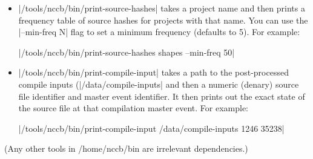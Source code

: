 \documentclass{report}
\begin{document}
\begin{itemize}
\item |/tools/nccb/bin/print-source-hashes| takes a project name and then prints
a frequency table of source hashes for projects with that name.  You can use the
|--min-freq N| flag to set a minimum frequency (defaults to 5).
For example:

|/tools/nccb/bin/print-source-hashes shapes --min-freq 50|

\item |/tools/nccb/bin/print-compile-input| takes a path to the post-processed compile inputs
(|/data/compile-inputs| and then a numeric (denary) source file identifier and master event
identifier.  It then prints out the exact state of the source file at that compilation master
event.  For example:

|/tools/nccb/bin/print-compile-input /data/compile-inputs 1246 35238|
\end{itemize}
(Any other tools in /home/nccb/bin are irrelevant dependencies.)
\end{document}
